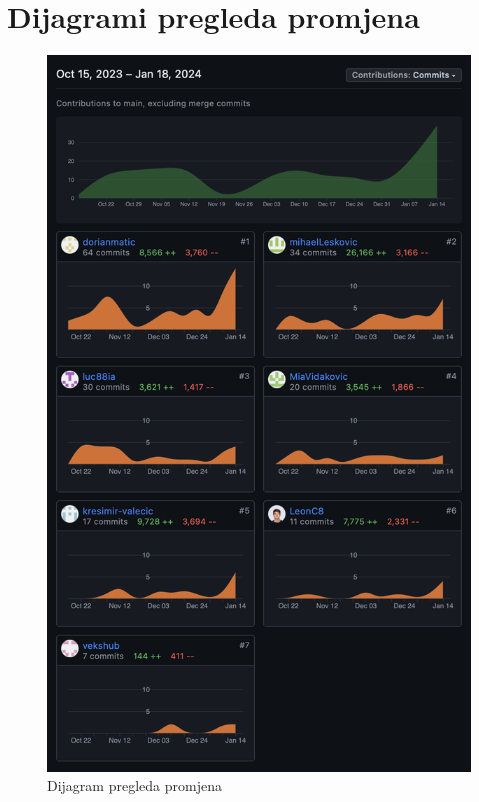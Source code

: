 					
		\eject
		\section*{Dijagrami pregleda promjena}
		
		
		\begin{figure}[H]
			\includegraphics[width=\textwidth]{slike/pregled-promjena.png} 
			\caption{Dijagram pregleda promjena}
		\end{figure}
	